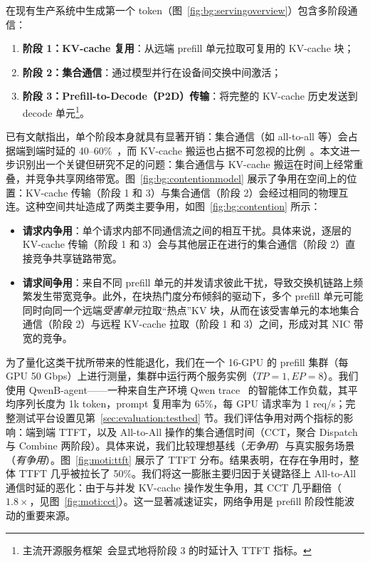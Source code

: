 在现有生产系统中生成第一个 token（图~\ref{fig:bg:servingoverview}）包含多阶段通信：
\begin{enumerate}[label=\(\bullet\),leftmargin=*]
    \item \textbf{阶段 1：KV-cache 复用}：从远端 prefill 单元拉取可复用的 KV-cache 块；
    \item \textbf{阶段 2：集合通信}：通过模型并行在设备间交换中间激活；
    \item \textbf{阶段 3：Prefill-to-Decode（P2D）传输}：将完整的 KV-cache 历史发送到 decode 单元\footnote{主流开源服务框架~\cite{vllm_pd_2025,sglang_pd_2025,dynamo_pd_2025}会显式地将阶段 3 的时延计入 TTFT 指标。}。
\end{enumerate}

已有文献指出，单个阶段本身就具有显著开销：集合通信（如 all-to-all 等）会占据端到端时延的 40--60\%~\cite{linaatc,comet,li2025optimizing,CP}，而 KV-cache 搬运也占据不可忽视的比例~\cite{cachegen,mooncake,chen2024kvdirect,li2025flowkv,yoon2025tract}。本文进一步识别出一个关键但研究不足的问题：集合通信与 KV-cache 搬运在时间上经常重叠，并竞争共享网络带宽。图~\ref{fig:bg:contentionmodel} 展示了争用在空间上的位置：KV-cache 传输（阶段 1 和 3）与集合通信（阶段 2）会经过相同的物理互连。这种空间共址造成了两类主要争用，如图~\ref{fig:bg:contention} 所示：
\begin{itemize}[leftmargin=*]
    \item \textbf{请求内争用}：单个请求内部不同通信流之间的相互干扰。具体来说，逐层的 KV-cache 传输（阶段 1 和 3）会与其他层正在进行的集合通信（阶段 2）直接竞争共享链路带宽。
    \item \textbf{请求间争用}：来自不同 prefill 单元的并发请求彼此干扰，导致交换机链路上频繁发生带宽竞争。此外，在块热门度分布倾斜的驱动下，多个 prefill 单元可能同时向同一个远端\textit{受害单元}拉取“热点”KV 块，从而在该受害单元的本地集合通信（阶段 2）与远程 KV-cache 拉取（阶段 1 和 3）之间，形成对其 NIC 带宽的竞争。
\end{itemize}



为了量化这类干扰所带来的性能退化，我们在一个 16-GPU 的 prefill 集群（每 GPU 50 Gbps）上进行测量，集群中运行两个服务实例（$TP=1, EP=8$）。我们使用 QwenB-agent——一种来自生产环境 Qwen trace~\cite{qwen_bailian_traces} 的智能体工作负载，其平均序列长度为 1k token，prompt 复用率为 65\%，每 GPU 请求率为 1 req/s；完整测试平台设置见第~\ref{sec:evaluation:testbed} 节。我们评估争用对两个指标的影响：端到端 TTFT，以及 All-to-All 操作的集合通信时间（CCT，聚合 Dispatch 与 Combine 两阶段）。具体来说，我们比较理想基线（\textit{无争用}）与真实服务场景（\textit{有争用}）。图~\ref{fig:moti:ttft} 展示了 TTFT 分布。结果表明，在存在争用时，整体 TTFT 几乎被拉长了 50\%。我们将这一膨胀主要归因于关键路径上 All-to-All 通信时延的恶化：由于与并发 KV-cache 操作发生争用，其 CCT 几乎翻倍（$1.8\times$，见图~\ref{fig:moti:cct}）。这一显著减速证实，网络争用是 prefill 阶段性能波动的重要来源。

